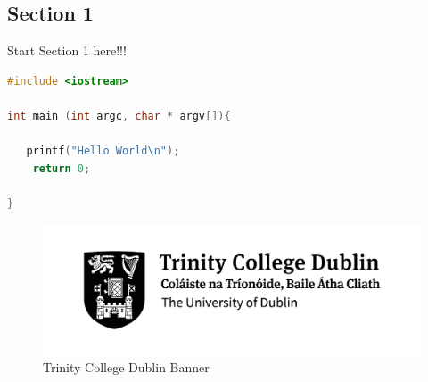 \textcolor{tcd_blue}{\section{Section 1}}

\vspace{1cm}

Start Section 1 here!!!

\vspace{1cm}

\begin{lstlisting}[language=c, caption= this is a code block]
#include <iostream>

int main (int argc, char * argv[]){

   printf("Hello World\n");
    return 0;

}
\end{lstlisting}

\vspace{1cm}

\begin{figure}[h!]
    \centering
    \includegraphics[width=0.75\linewidth]{images/Trinity_Black_Logo.jpg}
    \caption{Trinity College Dublin Banner}
    \label{fig:enter-label}
\end{figure}
